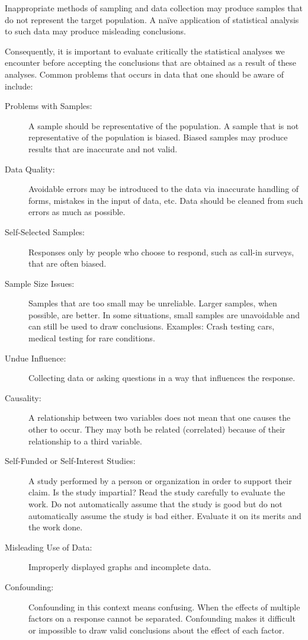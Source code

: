 \documentclass[]{krantz}
\theoremstyle{definition}
\theoremstyle{definition}
\theoremstyle{definition}
\theoremstyle{remark}
\begin{document}
Inappropriate methods of sampling and data collection may produce
samples that do not represent the target population. A naïve application
of statistical analysis to such data may produce misleading conclusions.

Consequently, it is important to evaluate critically the statistical
analyses we encounter before accepting the conclusions that are obtained
as a result of these analyses. Common problems that occurs in data that
one should be aware of include:

\begin{description}
\item[Problems with Samples:]
A sample should be representative of the population. A sample that is
not representative of the population is biased. Biased samples may
produce results that are inaccurate and not valid.
\item[Data Quality:]
Avoidable errors may be introduced to the data via inaccurate handling
of forms, mistakes in the input of data, etc. Data should be cleaned
from such errors as much as possible.
\item[Self-Selected Samples:]
Responses only by people who choose to respond, such as call-in surveys,
that are often biased.
\item[Sample Size Issues:]
Samples that are too small may be unreliable. Larger samples, when
possible, are better. In some situations, small samples are unavoidable
and can still be used to draw conclusions. Examples: Crash testing cars,
medical testing for rare conditions.
\item[Undue Influence:]
Collecting data or asking questions in a way that influences the
response.
\item[Causality:]
A relationship between two variables does not mean that one causes the
other to occur. They may both be related (correlated) because of their
relationship to a third variable.
\item[Self-Funded or Self-Interest Studies:]
A study performed by a person or organization in order to support their
claim. Is the study impartial? Read the study carefully to evaluate the
work. Do not automatically assume that the study is good but do not
automatically assume the study is bad either. Evaluate it on its merits
and the work done.
\item[Misleading Use of Data:]
Improperly displayed graphs and incomplete data.
\item[Confounding:]
Confounding in this context means confusing. When the effects of
multiple factors on a response cannot be separated. Confounding makes it
difficult or impossible to draw valid conclusions about the effect of
each factor.
\end{description}
\end{document}
